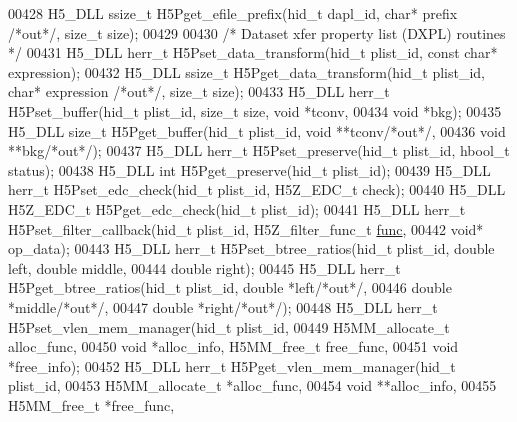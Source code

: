 \begin{DoxyCode}
00428 H5\_DLL ssize\_t H5Pget\_efile\_prefix(hid\_t dapl\_id, \textcolor{keywordtype}{char}* prefix \textcolor{comment}{/*out*/}, \textcolor{keywordtype}{size\_t} size);
00429 
00430 \textcolor{comment}{/* Dataset xfer property list (DXPL) routines */}
00431 H5\_DLL herr\_t H5Pset\_data\_transform(hid\_t plist\_id, \textcolor{keyword}{const} \textcolor{keywordtype}{char}* expression);
00432 H5\_DLL ssize\_t H5Pget\_data\_transform(hid\_t plist\_id, \textcolor{keywordtype}{char}* expression \textcolor{comment}{/*out*/}, \textcolor{keywordtype}{size\_t} size);
00433 H5\_DLL herr\_t H5Pset\_buffer(hid\_t plist\_id, \textcolor{keywordtype}{size\_t} size, \textcolor{keywordtype}{void} *tconv,
00434         \textcolor{keywordtype}{void} *bkg);
00435 H5\_DLL \textcolor{keywordtype}{size\_t} H5Pget\_buffer(hid\_t plist\_id, \textcolor{keywordtype}{void} **tconv\textcolor{comment}{/*out*/},
00436         \textcolor{keywordtype}{void} **bkg\textcolor{comment}{/*out*/});
00437 H5\_DLL herr\_t H5Pset\_preserve(hid\_t plist\_id, hbool\_t status);
00438 H5\_DLL \textcolor{keywordtype}{int} H5Pget\_preserve(hid\_t plist\_id);
00439 H5\_DLL herr\_t H5Pset\_edc\_check(hid\_t plist\_id, H5Z\_EDC\_t check);
00440 H5\_DLL H5Z\_EDC\_t H5Pget\_edc\_check(hid\_t plist\_id);
00441 H5\_DLL herr\_t H5Pset\_filter\_callback(hid\_t plist\_id, H5Z\_filter\_func\_t \hyperlink{structfunc}{func},
00442                                      \textcolor{keywordtype}{void}* op\_data);
00443 H5\_DLL herr\_t H5Pset\_btree\_ratios(hid\_t plist\_id, \textcolor{keywordtype}{double} left, \textcolor{keywordtype}{double} middle,
00444        \textcolor{keywordtype}{double} right);
00445 H5\_DLL herr\_t H5Pget\_btree\_ratios(hid\_t plist\_id, \textcolor{keywordtype}{double} *left\textcolor{comment}{/*out*/},
00446        \textcolor{keywordtype}{double} *middle\textcolor{comment}{/*out*/},
00447        \textcolor{keywordtype}{double} *right\textcolor{comment}{/*out*/});
00448 H5\_DLL herr\_t H5Pset\_vlen\_mem\_manager(hid\_t plist\_id,
00449                                        H5MM\_allocate\_t alloc\_func,
00450                                        \textcolor{keywordtype}{void} *alloc\_info, H5MM\_free\_t free\_func,
00451                                        \textcolor{keywordtype}{void} *free\_info);
00452 H5\_DLL herr\_t H5Pget\_vlen\_mem\_manager(hid\_t plist\_id,
00453                                        H5MM\_allocate\_t *alloc\_func,
00454                                        \textcolor{keywordtype}{void} **alloc\_info,
00455                                        H5MM\_free\_t *free\_func,

\end{DoxyCode}
